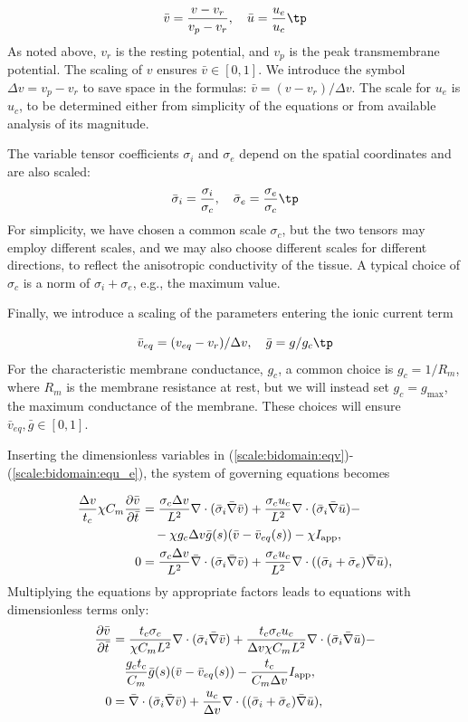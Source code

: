 \documentclass[graybox,envcountchap,sectrefs,final]{svmonodo}
\begin{document}
\[ \bar v = \frac{v-v_r}{v_p-v_r},\quad \bar u = \frac{u_e}{u_c} \tp\]
As noted above, $v_r$ is the resting potential, and $v_p$ is the peak
transmembrane potential.
The scaling of $v$ ensures $\bar v\in [0,1]$. We introduce the symbol
$\Delta v = v_p-v_r$ to save space in the formulas: $\bar v = (v-v_r)/\Delta v$.
The scale for $u_e$ is $u_c$, to be
determined either from simplicity of the equations or from available analysis of
its magnitude.

The variable tensor coefficients $\sigma_i$ and $\sigma_e$ depend on the spatial
coordinates and are also scaled:
\[ \bar \sigma_i = \frac{\sigma_i}{\sigma_c},\quad \bar \sigma_e = \frac{\sigma_e}{\sigma_c}\tp\]
For simplicity, we have chosen a common scale $\sigma_c$, but the two tensors
may employ different scales, and we may also choose different scales
for different directions, to reflect the anisotropic conductivity of
the tissue. A typical choice of $\sigma_c$ is a norm of
$\sigma_i + \sigma_e$, e.g., the maximum value.

Finally, we introduce a scaling of the parameters entering the ionic
current term

\[ \bar v_{eq} = (v_{eq}-v_r)/\Delta v,\quad\bar g = g/g_c\tp\]
For the characteristic membrane conductance, $g_c$,  a common choice is
$g_c = 1/R_m$, where $R_m$ is the membrane resistance at
rest, but we will instead set $g_c = g_{\max}$, the maximum conductance
of the membrane. These choices will ensure $\bar v_{eq}, \bar g \in
[0,1]$.


Inserting the dimensionless variables in 
(\ref{scale:bidomain:eqv})-(\ref{scale:bidomain:equ_e}), the system
of governing equations becomes

\begin{align*}
\frac{\Delta v}{t_c}\chi C_m\frac{\partial \bar v}{\partial \bar t} &=
\frac{\sigma_c\Delta v }{L^2}\nabla\cdot( \bar \sigma_i\bar\nabla\bar v) +
\frac{\sigma_c u_c}{L^2}\nabla\cdot (\bar \sigma_i\bar \nabla \bar u) -\\ 
&\quad - \chi g_c \Delta v \bar g (s)(\bar v-\bar v_{eq}(s)) -\chi I_{\rm{app}},
\\ 
0 &= \frac{\sigma_c\Delta v }{L^2}\bar \nabla\cdot( \bar \sigma_i\bar \nabla \bar v) + \frac{\sigma_cu_c}{L^2}\nabla\cdot ((\bar \sigma_i + \bar \sigma_e)\bar \nabla \bar u),\\ 
\end{align*}
Multiplying the equations by appropriate factors leads to equations with
dimensionless terms only:
\begin{align*}
\frac{\partial \bar v}{\partial \bar t} &=
\frac{t_c\sigma_c}{\chi C_mL^2}\nabla\cdot( \bar \sigma_i\bar\nabla\bar v) +
\frac{t_c\sigma_c u_c}{\Delta v \chi C_mL^2}\nabla\cdot (\bar
\sigma_i\bar \nabla \bar u) - \\ 
&\quad
\frac{g_c t_c}{C_m} \bar g (s)(\bar v-\bar v_{eq}(s))
- \frac{t_c}{C_m\Delta v} I_{\rm{app}},\\ 
0 &= \bar \nabla\cdot( \bar \sigma_i\bar \nabla \bar v) + \frac{u_c}{\Delta v}\nabla\cdot ((\bar \sigma_i + \bar \sigma_e)\bar \nabla \bar u),\\ 
\end{align*}
\end{document}
